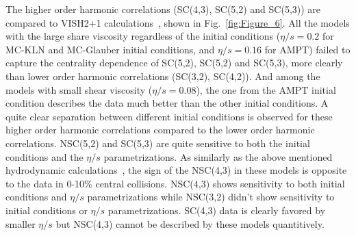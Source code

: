 \documentclass[ALICE,manyauthors]{cernphprep}
\begin{document}
The higher order harmonic correlations (SC(4,3), SC(5,2) and SC(5,3)) are compared to VISH2+1 calculations~\cite{Zhu:2016puf}, shown in Fig.~\ref{fig:Figure_6}. 
All the models with the large share viscosity regardless of the initial conditions ($\eta/s=0.2$ for MC-KLN and MC-Glauber initial conditions, and $\eta/s=0.16$ for AMPT) failed to capture the centrality dependence of SC(5,2), SC(5,2) and SC(5,3), more clearly than lower order harmonic correlations (SC(3,2), SC(4,2)).
And among the models with small shear viscosity ($\eta/s=0.08$), the one from the AMPT initial condition describes the data much better than the other initial conditions. 
A quite clear separation between different initial conditions is observed for these higher order harmonic correlations compared to the lower order harmonic correlations.
NSC(5,2) and SC(5,3) are quite sensitive to both the initial conditions and the $\eta/s$ parametrizations.
As similarly as the above mentioned hydrodynamic calculations~\cite{Niemi:2015qia}, the sign of the NSC(4,3) in these models is opposite to the data in 0-10\% central collisions. NSC(4,3) shows sensitivity to both initial conditions and $\eta/s$ parametrizations while NSC(3,2) didn't show sensitivity to initial conditions or $\eta/s$ parametrizations.
SC(4,3) data is clearly favored by smaller $\eta/s$ but NSC(4,3) cannot be described by these models quantitively.
     
\end{document}

